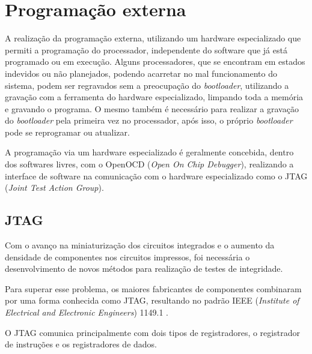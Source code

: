 

\section{Programação externa}
A realização da programação externa, utilizando um hardware especializado que  permiti a programação do processador, independente do software que já está programado ou em execução.
Alguns processadores, que se encontram em estados indevidos ou não planejados, podendo acarretar no mal funcionamento do sistema, podem ser regravados sem a preocupação do \textit{bootloader}, utilizando a gravação com a ferramenta do hardware especializado, limpando toda a memória e gravando o programa. O mesmo também é necessário para realizar a gravação do \textit{bootloader} pela primeira vez no processador, após isso, o próprio \textit{bootloader} pode se reprogramar ou atualizar.

A programação via um hardware especializado é geralmente concebida, dentro dos softwares livres, com o OpenOCD (\textit{Open On Chip Debugger})\cite{openocd}, realizando a interface de software na comunicação com o hardware especializado como o JTAG (\textit{Joint Test Action Group}).


\subsection{JTAG}

Com o avanço na miniaturização dos circuitos integrados e o aumento da densidade de componentes nos circuitos impressos, foi necessária o desenvolvimento de novos métodos para realização de testes de integridade.

Para superar esse problema, os maiores fabricantes de componentes combinaram por uma forma conhecida como JTAG, resultando no padrão IEEE (\textit{Institute of Electrical and Electronic Engineers}) 1149.1 \cite{jtagcite}.

O JTAG comunica principalmente com dois tipos de registradores, o registrador de instruções e os registradores de dados.

